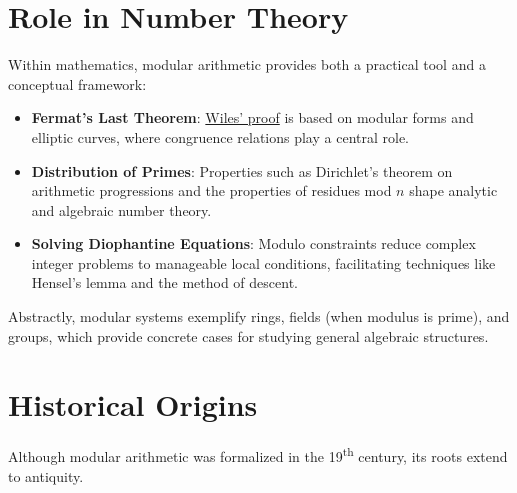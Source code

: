 \documentclass[12pt,openany]{book}
\theoremstyle{definition}
\theoremstyle{plain}
\theoremstyle{remark}
\begin{document}
\section{Role in Number Theory}
Within mathematics, modular arithmetic provides both a practical tool and a conceptual framework:
\begin{itemize}
  \item \textbf{Fermat's Last Theorem}: \href{https://en.wikipedia.org/wiki/Wiles%27s_proof_of_Fermat%27s_Last_Theorem}{Wiles' proof} is based on modular forms and elliptic curves, where congruence relations play a central role.
  \item \textbf{Distribution of Primes}: Properties such as Dirichlet’s theorem on arithmetic progressions and the properties of residues mod $n$ shape analytic and algebraic number theory.
  \item \textbf{Solving Diophantine Equations}: Modulo constraints reduce complex integer problems to manageable local conditions, facilitating techniques like Hensel’s lemma and the method of descent.
\end{itemize}

Abstractly, modular systems exemplify rings, fields (when modulus is prime), and groups, which provide concrete cases for studying general algebraic structures.

\section{Historical Origins}

Although modular arithmetic was formalized in the 19\textsuperscript{th} century, its roots extend to antiquity.
\end{document}
